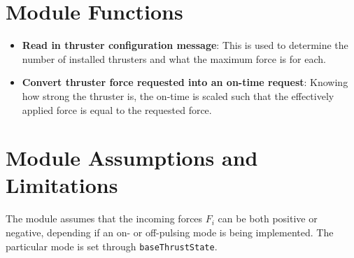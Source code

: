 

\section{Module Functions}
\begin{itemize}
	\item \textbf{Read in thruster configuration message}: This is used to determine the number of installed thrusters and what the maximum force is for each.
	\item \textbf{Convert thruster force requested into an on-time request}: Knowing how strong the thruster is, the on-time is scaled such that the effectively applied force is equal to the requested force.
\end{itemize}

\section{Module Assumptions and Limitations}
The module assumes that the incoming forces $F_{i}$ can be both positive or negative, depending if an on- or off-pulsing mode is being implemented.  The particular mode is set through {\tt baseThrustState}.  